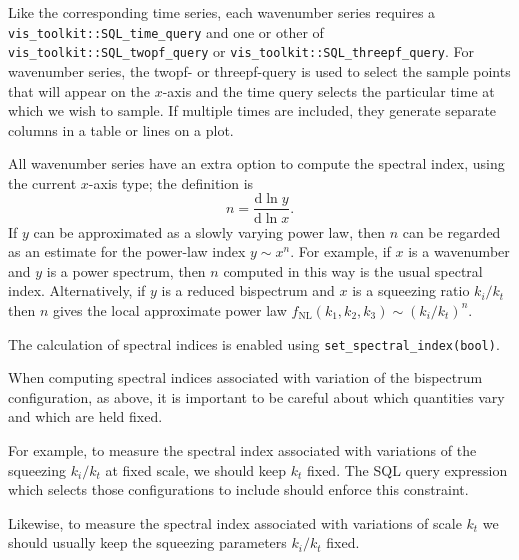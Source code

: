 \documentclass[11pt,a4paper]{article}
\newenvironment{warning}{\begin{tcolorbox}[enhanced,breakable,colback=red!10,colbacktitle=red!20,colframe=red!40,coltitle=black,title={Warning},fonttitle=\sffamily\fontseries{b}\selectfont]}{\end{tcolorbox}}
\renewcommand{\d}{\mathrm{d}}
\newcommand{\fNL}{f_{\mathrm{NL}}}
\newcommand{\semibold}[1]{{\fontseries{b}\selectfont{#1}}}
\newcommand{\para}[1]{\par\vspace{2mm}\noindent\semibold{{#1.}---}\ignorespaces}
\begin{document}
Like the corresponding time series, each wavenumber series
requires
a \texttt{vis_toolkit::SQL_time_query}
and one
or other of
\texttt{vis_toolkit::SQL_twopf_query} or
\texttt{vis_toolkit::SQL_threepf_query}.
For wavenumber series, the twopf- or threepf-query is used to select the
sample points that will appear on the $x$-axis
and the time query selects the particular time at which we wish to sample.
If multiple times are included, they generate separate columns in a table
or lines on a plot.

\para{Spectral indices}
All wavenumber series have an extra option to compute the spectral index,
using the current $x$-axis type;
the definition is
\begin{equation}
    n = \frac{\d \ln y}{\d \ln x} .    
\end{equation}
If $y$ can be approximated as a slowly varying power law, then $n$
can be regarded as an estimate for the power-law index
$y \sim x^n$.
For example, if $x$ is a wavenumber and $y$ is a power spectrum, then
$n$ computed in this way is the usual spectral index.
Alternatively, if $y$ is a reduced bispectrum and
$x$ is a squeezing ratio $k_i/k_t$ then
$n$ gives the local approximate power law
$\fNL(k_1, k_2, k_3) \sim (k_i/k_t)^n$.

The calculation of spectral indices is enabled using
\texttt{set_spectral_index(bool)}.

\begin{warning}
    When computing spectral indices associated with variation of the
    bispectrum configuration, as above, it is important to be
    careful about which quantities vary and which are held fixed.

    For example, to measure the spectral index associated with
    variations of the squeezing $k_i/k_t$ at fixed scale, we should keep
    $k_t$ fixed. The SQL query expression which selects those configurations
    to include should enforce this constraint.

    Likewise, to measure the spectral index associated with variations of
    scale $k_t$ we should usually keep the squeezing parameters $k_i/k_t$ fixed.
\end{warning}
\end{document}
